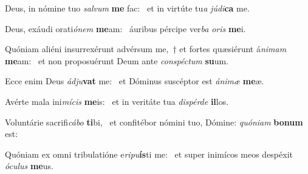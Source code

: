 \item Deus, in nómine tuo \textit{salvum} \textbf{me} fac:~\psstar{} et in virtúte tu\textit{a} \textit{júdi}\textbf{ca} me.
\item Deus, exáudi orati\textit{ónem} \textbf{me}am:~\psstar{} áuribus pércipe ver\textit{ba} \textit{oris} \textbf{me}i.
\item Quóniam aliéni insurrexérunt advérsum me,~† et fortes quæsiérunt á\textit{nimam} \textbf{me}am:~\psstar{} et non proposuérunt Deum ante \textit{conspéctum} \textbf{su}um.
\item Ecce enim Deus \textit{ádju}\textbf{vat} me:~\psstar{} et Dóminus suscéptor est \textit{ánimæ} \textbf{me}æ.
\item Avérte mala ini\textit{mícis} \textbf{me}is:~\psstar{} et in veritáte tua \textit{dispérde} \textbf{il}los.
\item Voluntárie sacrifi\textit{cábo} \textbf{ti}bi,~\psstar{} et confitébor nómini tuo, Dómine: \textit{quóniam} \textbf{bo}\textbf{num} est:
\item Quóniam ex omni tribulatióne e\textit{ripu}\textbf{ís}ti me:~\psstar{} et super inimícos meos despéxit \textit{óculus} \textbf{me}us.
